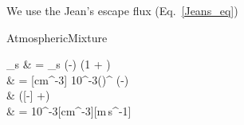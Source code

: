 We use the Jean's escape flux (Eq.~\ref{Jeans_eq})
\begin{equationCode}{AtmosphericMixture}
\begin{split}
\Jeans_s &     = \conc_s 
                 \exp\left(-\right)
                 \left(1 + \right) \\
\uu [cm^{-3}\,km\,s^{-1}]   
         & \uu = [cm^{-3}] 10^{-3}\left(\frac{[\ukb] [K]}{[kg]}\right)^{}
                 \exp\left(-\right) \\
         & \uu\fakeequalspace
                 \left([-] +\right) \\
         & \uu = 10^{-3}[cm^{-3}][m\,s^{-1}]
\end{split}
\label{Jeans_eq}
\end{equationCode}
